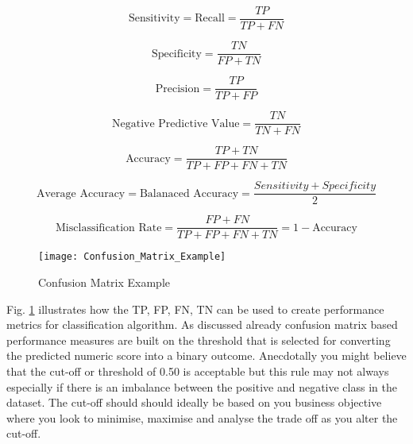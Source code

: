 \begin{equation} \label{eq:Sensitivity}
\text{Sensitivity} = \text{Recall} = \frac{TP}{TP + FN}
\end{equation}

\begin{equation} \label{eq:Specificity}
\text{Specificity} = \frac{TN}{FP + TN}
\end{equation}

\begin{equation} \label{eq:precision}
\text{Precision} = \frac{TP}{TP + FP}
\end{equation}

\begin{equation} \label{eq:npv}
\text{Negative Predictive Value} = \frac{TN}{TN + FN}
\end{equation}

\begin{equation} \label{eq:Accuracy}
\text{Accuracy} = \frac{TP + TN}{TP + FP + FN + TN}
\end{equation}

\begin{equation} \label{eq:Balanaced Accuracy}
\text{Average Accuracy} = \text{Balanaced Accuracy} = \frac{Sensitivity + Specificity}{2}
\end{equation}

\begin{equation} \label{eq:Misclassification Rate}
\text{Misclassification Rate} =  \frac{FP + FN}{TP + FP + FN + TN} = 1 - \text{Accuracy}
\end{equation}

\begin{figure}[H]
	\texttt{[image: Confusion\_Matrix\_Example]}
	\caption[Confusion Matrix Example]
	{Confusion Matrix Example}
	\label{fig:ConfusionMatrixExample}
\end{figure}

Fig. \ref{fig:ConfusionMatrixExample} illustrates how the TP, FP, FN, TN can be used to create performance metrics for classification algorithm. As discussed already confusion matrix based performance measures are built on the threshold that is selected for converting the predicted numeric score into a binary outcome. Anecdotally you might believe that the cut-off or threshold of 0.50 is acceptable but this rule may not always especially if there is an imbalance between the positive and negative class in the dataset. The cut-off should should ideally be based on you business objective where you look to minimise, maximise and analyse the trade off as you alter the cut-off. 

